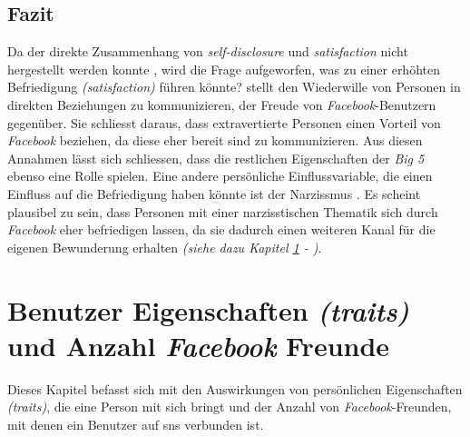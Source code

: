 \subsection{Fazit}\label{subsec.amountFazit}
Da der direkte Zusammenhang von \textit{self-disclosure} und \textit{satisfaction} nicht hergestellt werden konnte \cite{Special:2012}, wird die Frage aufgeworfen, was zu einer erhöhten Befriedigung \textit{(satisfaction)} führen könnte?  stellt den Wiederwille von Personen in direkten Beziehungen zu kommunizieren, der Freude von \textit{Facebook}-Benutzern gegenüber. Sie schliesst daraus, dass extravertierte Personen einen Vorteil von \textit{Facebook} beziehen, da diese eher bereit sind zu kommunizieren. Aus diesen Annahmen lässt sich schliessen, dass die restlichen Eigenschaften der \textit{Big 5} ebenso eine Rolle spielen.\newline
Eine andere persönliche Einflussvariable, die einen Einfluss auf die Befriedigung haben könnte ist der Narzissmus \cite{Special:2012}. Es scheint plausibel zu sein, dass Personen mit einer narzisstischen Thematik sich durch \textit{Facebook} eher befriedigen lassen, da sie dadurch einen weiteren Kanal für die eigenen Bewunderung erhalten \textit{(siehe dazu Kapitel \ref{sub.traits} - )}.

\section{Benutzer Eigenschaften \textit{(traits)} und Anzahl \textit{Facebook} Freunde}\label{sub.traits}
Dieses Kapitel befasst sich mit den Auswirkungen von persönlichen Eigenschaften \textit{(traits)}, die eine Person mit sich bringt und der Anzahl von \textit{Facebook}-Freunden, mit denen ein Benutzer auf \gls{sns} verbunden ist.


